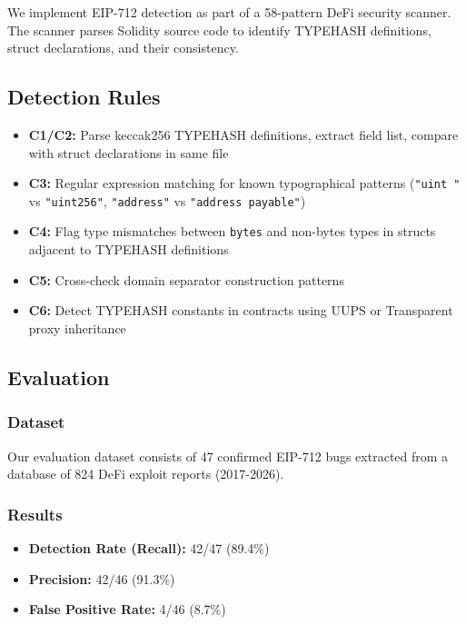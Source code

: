 \documentclass[runningheads]{llncs}
\begin{document}
We implement EIP-712 detection as part of a 58-pattern DeFi security scanner. The scanner parses Solidity source code to identify TYPEHASH definitions, struct declarations, and their consistency.

\subsection{Detection Rules}

\begin{itemize}
    \item \textbf{C1/C2:} Parse keccak256 TYPEHASH definitions, extract field list, compare with struct declarations in same file
    \item \textbf{C3:} Regular expression matching for known typographical patterns (\texttt{"uint "} vs \texttt{"uint256"}, \texttt{"address"} vs \texttt{"address payable"})
    \item \textbf{C4:} Flag type mismatches between \texttt{bytes} and non-bytes types in structs adjacent to TYPEHASH definitions
    \item \textbf{C5:} Cross-check domain separator construction patterns
    \item \textbf{C6:} Detect TYPEHASH constants in contracts using UUPS or Transparent proxy inheritance
\end{itemize}

\subsection{Evaluation}

\subsubsection{Dataset}
Our evaluation dataset consists of 47 confirmed EIP-712 bugs extracted from a database of 824 DeFi exploit reports (2017-2026).

\subsubsection{Results}
\begin{itemize}
    \item \textbf{Detection Rate (Recall):} 42/47 (89.4\%)
    \item \textbf{Precision:} 42/46 (91.3\%)
    \item \textbf{False Positive Rate:} 4/46 (8.7\%)
\end{itemize}
\end{document}
